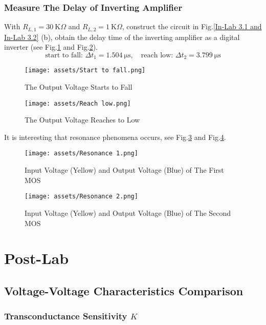 \documentclass[UTF8]{article}
\def\KO{\ \mathrm{K}\Omega}
\def\KO{\ \mathrm{K}\Omega}
\theoremstyle{MyLineTheoremStyle} %
\theoremstyle{MyBlockTheoremStyle} %
\theoremstyle{MySubsubsectionStyle} %
\begin{document}
\subsubsection{Measure The Delay of Inverting Amplifier}
With $R_{L, 1} = 30 \KO$ and $R_{L, 2} = 1 \KO$, construct the circuit in Fig.\ref{In-Lab 3.1 and In-Lab 3.2} (b), obtain the delay time of the inverting amplifier as a digital inverter (see Fig.\ref{Starts to Fall} and Fig.\ref{Reaches to Low}).
\begin{equation}
\text{start to fall:\ \ } \Delta t_1 = 1.504 \ \mathrm{\mu s},\quad \text{reach low:\ \ } \Delta t_2 = 3.799 \ \mathrm{\mu s}
\end{equation}
\begin{figure}[H]\centering
    \texttt{[image: assets/Start to fall.png]}
    \caption{The Output Voltage Starts to Fall}
    \label{Starts to Fall}
\end{figure}
\begin{figure}[H]\centering
    \texttt{[image: assets/Reach low.png]}
    \caption{The Output Voltage Reaches to Low}
    \label{Reaches to Low}
\end{figure}

It is interesting that resonance phenomena occurs, see Fig.\ref{Resonance 1} and Fig.\ref{Resonance 2}.
\begin{figure}[H]\centering
    \texttt{[image: assets/Resonance 1.png]}
    \caption{Input Voltage (Yellow) and Output Voltage (Blue) of The First MOS}
    \label{Resonance 1}
\end{figure}
\begin{figure}[H]\centering
    \texttt{[image: assets/Resonance 2.png]}
    \caption{Input Voltage (Yellow) and Output Voltage (Blue) of The Second MOS}
    \label{Resonance 2}
\end{figure}

\section{Post-Lab}
\subsection{Voltage-Voltage Characteristics Comparison}
\subsubsection{Transconductance Sensitivity $K$}
\end{document}

